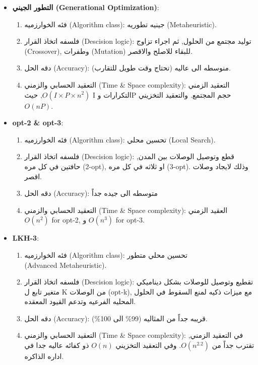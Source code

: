 \documentclass{article}
\newcommand{\en}[1]{\textenglish{#1}}
\begin{document}
\begin{itemize}
	\item \textbf{التطور الجيني (\en{Generational Optimization})}:
		\begin{enumerate}
			\item فئه الخوارزميه (\en{Algorithm class}):
جينيه تطوريه (\en{Metaheuristic}).
			\item فلسفه اتخاذ القرار  (\en{Descision logic}):
توليد مجتمع من الحلول, ثم اجراء تزاوج (\en{Crossover}), وطفرات (\en{Mutation}) للبقاء للاصلح والاقصر.
			\item دقه الحل (\en{Accuracy}):
منوسطه الى عاليه (تحتاج وقت طويل للتقارب).
			\item التعقيد الحسابي والزمني (\en{Time \& Space complexity}):
التعقيد الزمني $O(I \times P \times n^2)$, حيث \en{I} التكرارات و\en{P} حجم المجتمع. والتعقيد التخزيني $O(nP)$.
		\end{enumerate}
	\item \textbf{\en{opt-2 \& opt-3}}:
		\begin{enumerate}
			\item فئه الخوارزميه (\en{Algorithm class}):
تحسين محلي (\en{Local Search}).
			\item فلسفه اتخاذ القرار  (\en{Descision logic}):
قطع وتوصيل الوصلات بين المدن, حافتين في كل مره (\en{2-opt}), او ثلاثه في كل مره (\en{3-opt}). وذلك لايجاد وصلات اقصر.
			\item دقه الحل (\en{Accuracy}):
متوسطه الى جيده جداً
			\item التعقيد الحسابي والزمني (\en{Time \& Space complexity}): 
العقيد الزمني $O(n^2)$ \en{for opt-2}, و $O(n^3)$ \en{for opt-3}.
		\end{enumerate}
	\item \textbf{LKH-3}:
		\begin{enumerate}
			\item فئه الخوارزميه (\en{Algorithm class}):
تحسين محلي متطور \\ (\en{Advanced Metaheuristic}).
			\item فلسفه اتخاذ القرار  (\en{Descision logic}): 
تقطيع وتوصيل للوصلات بشكل ديناميكي متغير تابع ل K من الوصلات (opt-k), مع ميزات ذكيه لمنع السقوط في الحلول المحليه الفرعيه وتدعم القيود المعقده.
			\item دقه الحل (\en{Accuracy}):
قريبه جداً من المثاليه (99\% الى 100\%).
			\item التعقيد الحسابي والزمني (\en{Time \& Space complexity}):
في التعقيد الزمني, تقترب جداً من $O(n^{2.2})$. وفي التعقيد التخزيني $O(n)$ ذو كفائه عاليه جدا في اداره الذاكره.
		\end{enumerate}
\end{itemize}
\end{document}
